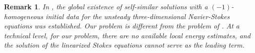 \documentclass[12pt]{amsart}
\newtheorem{remark}{Remark}[section]
\begin{document}
	\begin{remark}
		In \cite{Jia14},  the global existence of self-similar solutions with a $(-1)$-homogeneous initial data for the unsteady three-dimensional Navier-Stokes equations was established. Our problem is  different from the problem of \cite{Jia14}.
		At a technical level, for our problem, there are no available local energy estimates, and the solution of the  linearized Stokes equations cannot serve as the leading term. 
	\end{remark}
	
\end{document}
